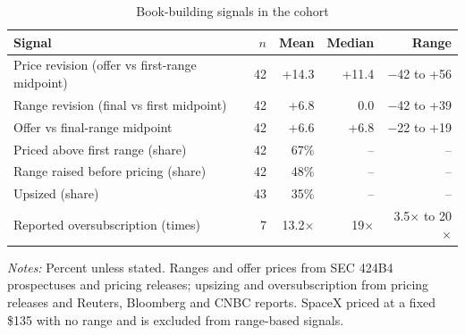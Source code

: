 \begin{table}[!htbp]\centering\footnotesize
\caption{Book-building signals in the cohort}\label{tab:s1}

\begin{threeparttable}
\begin{tabular}{lrrrr}
\toprule
Signal & $n$ & Mean & Median & Range \\
\midrule
Price revision (offer vs first-range midpoint) & 42 & +14.3 & +11.4 & $-$42 to +56 \\
Range revision (final vs first midpoint) & 42 & +6.8 & 0.0 & $-$42 to +39 \\
Offer vs final-range midpoint & 42 & +6.6 & +6.8 & $-$22 to +19 \\
Priced above first range (share) & 42 & 67\% & -- & -- \\
Range raised before pricing (share) & 42 & 48\% & -- & -- \\
Upsized (share) & 43 & 35\% & -- & -- \\
Reported oversubscription (times) & 7 & 13.2$\times$ & 19$\times$ & 3.5$\times$ to 20$\times$ \\
\bottomrule
\end{tabular}
\begin{tablenotes}[flushleft]\footnotesize
\item \textit{Notes:} Percent unless stated. Ranges and offer prices from SEC 424B4 prospectuses and pricing releases; upsizing and oversubscription from pricing releases and Reuters, Bloomberg and CNBC reports. SpaceX priced at a fixed \$135 with no range and is excluded from range-based signals.
\end{tablenotes}
\end{threeparttable}

\end{table}
